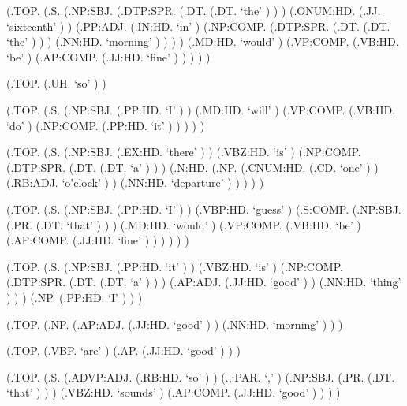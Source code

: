 \documentclass[10pt]{article}
\begin{document}
\begin{parsetree}  (.TOP. (.S. (.NP:SBJ. (.DTP:SPR. (.DT. (.DT. `the' ) ) ) (.ONUM:HD. (.JJ. `sixteenth' ) ) (.PP:ADJ. (.IN:HD. `in' ) (.NP:COMP. (.DTP:SPR. (.DT. (.DT. `the' ) ) ) (.NN:HD. `morning' ) ) ) ) (.MD:HD. `would' ) (.VP:COMP. (.VB:HD. `be' ) (.AP:COMP. (.JJ:HD. `fine' ) ) ) ) ) \end{parsetree}

\begin{parsetree}  (.TOP. (.UH. `so' ) ) \end{parsetree}

\begin{parsetree}  (.TOP. (.S. (.NP:SBJ. (.PP:HD. `I' ) ) (.MD:HD. `will' ) (.VP:COMP. (.VB:HD. `do' ) (.NP:COMP. (.PP:HD. `it' ) ) ) ) ) \end{parsetree}

\begin{parsetree}  (.TOP. (.S. (.NP:SBJ. (.EX:HD. `there' ) ) (.VBZ:HD. `is' ) (.NP:COMP. (.DTP:SPR. (.DT. (.DT. `a' ) ) ) (.N:HD. (.NP. (.CNUM:HD. (.CD. `one' ) ) (.RB:ADJ. `o'clock' ) ) (.NN:HD. `departure' ) ) ) ) ) \end{parsetree}

\begin{parsetree}  (.TOP. (.S. (.NP:SBJ. (.PP:HD. `I' ) ) (.VBP:HD. `guess' ) (.S:COMP. (.NP:SBJ. (.PR. (.DT. `that' ) ) ) (.MD:HD. `would' ) (.VP:COMP. (.VB:HD. `be' ) (.AP:COMP. (.JJ:HD. `fine' ) ) ) ) ) ) \end{parsetree}

\begin{parsetree}  (.TOP. (.S. (.NP:SBJ. (.PP:HD. `it' ) ) (.VBZ:HD. `is' ) (.NP:COMP. (.DTP:SPR. (.DT. (.DT. `a' ) ) ) (.AP:ADJ. (.JJ:HD. `good' ) ) (.NN:HD. `thing' ) ) ) (.NP. (.PP:HD. `I' ) ) ) \end{parsetree}

\begin{parsetree}  (.TOP. (.NP. (.AP:ADJ. (.JJ:HD. `good' ) ) (.NN:HD. `morning' ) ) ) \end{parsetree}

\begin{parsetree}  (.TOP. (.VBP. `are' ) (.AP. (.JJ:HD. `good' ) ) ) \end{parsetree}

\begin{parsetree}  (.TOP. (.S. (.ADVP:ADJ. (.RB:HD. `so' ) ) (.,:PAR. `,' ) (.NP:SBJ. (.PR. (.DT. `that' ) ) ) (.VBZ:HD. `sounds' ) (.AP:COMP. (.JJ:HD. `good' ) ) ) ) \end{parsetree}
\end{document}
